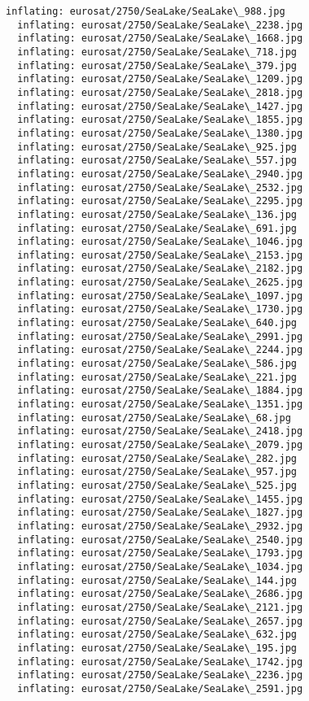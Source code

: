 \documentclass[11pt]{article}
\begin{document}
\begin{Verbatim}[commandchars=\\\{\}]
  inflating: eurosat/2750/SeaLake/SeaLake\_988.jpg
  inflating: eurosat/2750/SeaLake/SeaLake\_2238.jpg
  inflating: eurosat/2750/SeaLake/SeaLake\_1668.jpg
  inflating: eurosat/2750/SeaLake/SeaLake\_718.jpg
  inflating: eurosat/2750/SeaLake/SeaLake\_379.jpg
  inflating: eurosat/2750/SeaLake/SeaLake\_1209.jpg
  inflating: eurosat/2750/SeaLake/SeaLake\_2818.jpg
  inflating: eurosat/2750/SeaLake/SeaLake\_1427.jpg
  inflating: eurosat/2750/SeaLake/SeaLake\_1855.jpg
  inflating: eurosat/2750/SeaLake/SeaLake\_1380.jpg
  inflating: eurosat/2750/SeaLake/SeaLake\_925.jpg
  inflating: eurosat/2750/SeaLake/SeaLake\_557.jpg
  inflating: eurosat/2750/SeaLake/SeaLake\_2940.jpg
  inflating: eurosat/2750/SeaLake/SeaLake\_2532.jpg
  inflating: eurosat/2750/SeaLake/SeaLake\_2295.jpg
  inflating: eurosat/2750/SeaLake/SeaLake\_136.jpg
  inflating: eurosat/2750/SeaLake/SeaLake\_691.jpg
  inflating: eurosat/2750/SeaLake/SeaLake\_1046.jpg
  inflating: eurosat/2750/SeaLake/SeaLake\_2153.jpg
  inflating: eurosat/2750/SeaLake/SeaLake\_2182.jpg
  inflating: eurosat/2750/SeaLake/SeaLake\_2625.jpg
  inflating: eurosat/2750/SeaLake/SeaLake\_1097.jpg
  inflating: eurosat/2750/SeaLake/SeaLake\_1730.jpg
  inflating: eurosat/2750/SeaLake/SeaLake\_640.jpg
  inflating: eurosat/2750/SeaLake/SeaLake\_2991.jpg
  inflating: eurosat/2750/SeaLake/SeaLake\_2244.jpg
  inflating: eurosat/2750/SeaLake/SeaLake\_586.jpg
  inflating: eurosat/2750/SeaLake/SeaLake\_221.jpg
  inflating: eurosat/2750/SeaLake/SeaLake\_1884.jpg
  inflating: eurosat/2750/SeaLake/SeaLake\_1351.jpg
  inflating: eurosat/2750/SeaLake/SeaLake\_68.jpg
  inflating: eurosat/2750/SeaLake/SeaLake\_2418.jpg
  inflating: eurosat/2750/SeaLake/SeaLake\_2079.jpg
  inflating: eurosat/2750/SeaLake/SeaLake\_282.jpg
  inflating: eurosat/2750/SeaLake/SeaLake\_957.jpg
  inflating: eurosat/2750/SeaLake/SeaLake\_525.jpg
  inflating: eurosat/2750/SeaLake/SeaLake\_1455.jpg
  inflating: eurosat/2750/SeaLake/SeaLake\_1827.jpg
  inflating: eurosat/2750/SeaLake/SeaLake\_2932.jpg
  inflating: eurosat/2750/SeaLake/SeaLake\_2540.jpg
  inflating: eurosat/2750/SeaLake/SeaLake\_1793.jpg
  inflating: eurosat/2750/SeaLake/SeaLake\_1034.jpg
  inflating: eurosat/2750/SeaLake/SeaLake\_144.jpg
  inflating: eurosat/2750/SeaLake/SeaLake\_2686.jpg
  inflating: eurosat/2750/SeaLake/SeaLake\_2121.jpg
  inflating: eurosat/2750/SeaLake/SeaLake\_2657.jpg
  inflating: eurosat/2750/SeaLake/SeaLake\_632.jpg
  inflating: eurosat/2750/SeaLake/SeaLake\_195.jpg
  inflating: eurosat/2750/SeaLake/SeaLake\_1742.jpg
  inflating: eurosat/2750/SeaLake/SeaLake\_2236.jpg
  inflating: eurosat/2750/SeaLake/SeaLake\_2591.jpg

\end{Verbatim}
\end{document}

